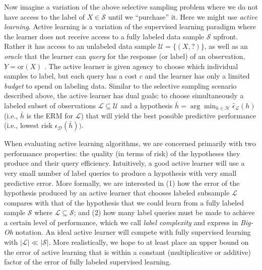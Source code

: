 Now imagine a variation of the above selective sampling problem where we do not have access to the label of $X \in \mathcal{S}$ until we ``purchase'' it. Here we might use \textit{active learning}. Active learning is a variation of the supervised learning paradigm where the learner does not receive access to a fully labeled data sample $\mathcal{S}$ upfront. Rather it has access to an unlabeled data sample $\mathcal{U} = \{(X, ?)\}$, as well as an \textit{oracle} that the learner can \textit{query} for the response (or label) of an observation, $Y = \mathrm{or}(X)$ \cite{Dasgupta:2011}. The active learner is given agency to choose which individual samples to label, but each query has a cost $c$ and the learner has only a limited \textit{budget} to spend on labeling data. Similar to the selective sampling scenario described above, the active learner has dual goals: to choose simultaneously a labeled subset of observations $\mathcal{L} \subseteq \mathcal{U}$ and a hypothesis $\bar{h} = \arg\min_{h \in \mathcal{H}} \hat{\epsilon}_{\mathcal{L}}(h)$ (i.e., $\bar{h}$ is the ERM for $\mathcal{L}$) that will yield the best possible predictive performance (i.e., lowest risk $\epsilon_{\mathcal{D}}(\bar{h}))$.

When evaluating active learning algorithms, we are concerned primarily with two performance properties: the quality (in terms of risk) of the hypotheses they produce and their query efficiency. Intuitively, a good active learner will use a very small number of label queries to produce a hypothesis with very small predictive error. More formally, we are interested in (1) how the error of the hypothesis produced by an active learner that chooses labeled subsample $\mathcal{L}$ compares with that of the hypothesis that we could learn from a fully labeled sample $\mathcal{S}$ where $\mathcal{L} \subseteq \mathcal{S}$; and (2) how many label queries must be made to achieve a certain level of performance, which we call \textit{label complexity} and express in \textit{Big-Oh} notation. An ideal active learner will compete with fully supervised learning with $|\mathcal{L}| \ll |\mathcal{S}|$. More realistically, we hope to at least place an upper bound on the error of active learning that is within a constant (multiplicative or additive) factor of the error of fully labeled supervised learning.

